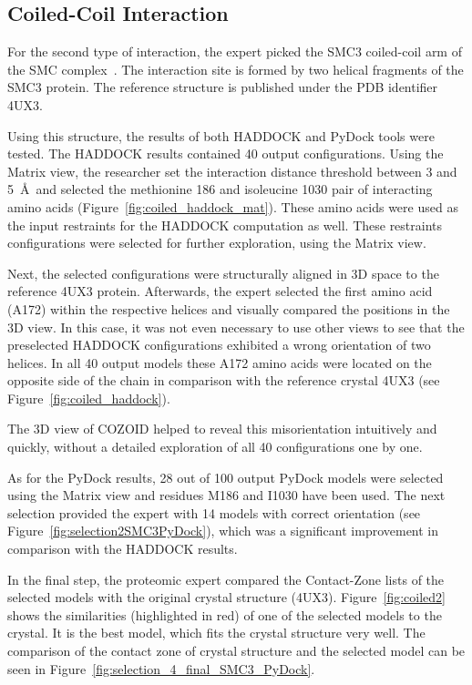 \documentclass{bmcart}
\def\MatView {Matrix view\xspace}
\def\CoZoLists{Contact-Zone lists\xspace}
\begin{document}
\subsection{Coiled-Coil Interaction}
For the second type of interaction, the expert picked the SMC3 coiled-coil arm of the SMC complex~\cite{Gligoris}.
The interaction site is formed by two helical fragments of the SMC3 protein.
The reference structure is published under the PDB identifier 4UX3.  

Using this structure, the results of both HADDOCK and PyDock tools were tested.
The HADDOCK results contained 40 output configurations.
Using the \MatView, the researcher set the interaction distance threshold between 3 and 5~\AA~and selected the methionine 186 and isoleucine 1030 pair of interacting amino acids (Figure~\ref{fig:coiled_haddock_mat}). 
These amino acids were used as the input restraints for the HADDOCK computation as well.
These restraints configurations were selected for further exploration, using the \MatView.

Next, the selected configurations were structurally aligned in 3D space to the reference 4UX3 protein.
Afterwards, the expert selected the first amino acid (A172) within the respective helices and visually compared the positions in the 3D view.
In this case, it was not even necessary to use other views to see that the preselected HADDOCK configurations exhibited a wrong orientation of two helices. 
In all 40 output models these A172 amino acids were located on the opposite side of the chain in comparison with the reference crystal 4UX3 (see Figure~\ref{fig:coiled_haddock}).

The 3D view of COZOID helped to reveal this misorientation intuitively and quickly, without a detailed exploration of all 40 configurations one by one.

As for the PyDock results, 28 out of 100 output PyDock models were selected using the \MatView and residues M186 and I1030 have been used.
The next selection provided the expert with 14 models with correct orientation (see Figure~\ref{fig:selection2SMC3PyDock}), which was a significant improvement in comparison with the HADDOCK results.

In the final step, the proteomic expert compared the \CoZoLists of the selected models with the original crystal structure (4UX3). 
Figure~\ref{fig:coiled2} shows the similarities (highlighted in red) of one of the selected models to the crystal. It is the best model, which fits the crystal structure very well. The comparison of the contact zone of crystal structure and the selected model can be seen in Figure~\ref{fig:selection_4_final_SMC3_PyDock}.
\end{document}
